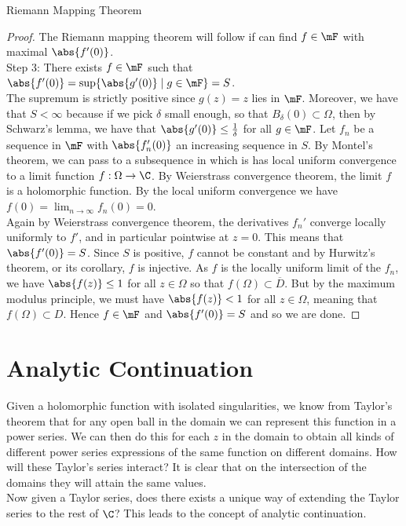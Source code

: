\documentclass[a4paper]{article}
\begin{document}
\begin{thm}{Riemann Mapping Theorem}{}
\begin{proof}
The Riemann mapping theorem will follow if can find $f\in\mF$ with maximal $\abs{f'(0)}$. \\

Step 3: There exists $f\in\mF$ such that $\abs{f'(0)}=\sup\{\abs{g'(0)}\;|\;g\in\mF\}=S$. \\
The supremum is strictly positive since $g(z)=z$ lies in $\mF$. Moreover, we have that $S<\infty$ because if we pick $\delta$ small enough, so that $B_\delta(0)\subset\Omega$, then by Schwarz's lemma, we have that $\abs{g'(0)}\leq\frac{1}{\delta}$ for all $g\in\mF$. Let $f_n$ be a sequence in $\mF$ with $\abs{f_n'(0)}$ an increasing sequence in $S$. By Montel's theorem, we can pass to a subsequence in which is has local uniform convergence to a limit function $f:\Omega\to\C$. By Weierstrass convergence theorem, the limit $f$ is a holomorphic function. By the local uniform convergence we have $f(0)=\lim_{n\to\infty}f_n(0)=0$. \\

Again by Weierstrass convergence theorem, the derivatives $f_n'$ converge locally uniformly to $f'$, and in particular pointwise at $z=0$. This means that $\abs{f'(0)}=S$. Since $S$ is positive, $f$ cannot be constant and by Hurwitz's theorem, or its corollary, $f$ is injective. As $f$ is the locally uniform limit of the $f_n$, we have $\abs{f(z)}\leq 1$ for all $z\in\Omega$ so that $f(\Omega)\subset\overline{D}$. But by the maximum modulus principle, we must have $\abs{f(z)}<1$ for all $z\in\Omega$, meaning that $f(\Omega)\subset D$. Hence $f\in\mF$ and $\abs{f'(0)}=S$ and so we are done. 
\end{proof}
\end{thm}

\pagebreak
\section{Analytic Continuation}
Given a holomorphic function with isolated singularities, we know from Taylor's theorem that for any open ball in the domain we can represent this function in a power series. We can then do this for each $z$ in the domain to obtain all kinds of different power series expressions of the same function on different domains. How will these Taylor's series interact? It is clear that on the intersection of the domains they will attain the same values. \\

Now given a Taylor series, does there exists a unique way of extending the Taylor series to the rest of $\C$? This leads to the concept of analytic continuation. 
\end{document}
